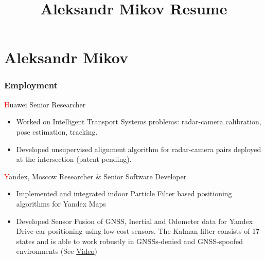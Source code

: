 \documentclass{tccv}
\title{Aleksandr Mikov Resume}
\makeatletter
\newcommand{\about@me}{}
\newcommand{\aboutme}[1]{\renewcommand{\about@me}{\subsection{About Me}#1}}
\makeatother
\begin{document}
\aboutme{\center{PhD, Researcher and algorithm developer in the indoor and outdoor navigation field\\with an emphasis on automotive and pedestrian applications.}}
\part{Aleksandr Mikov}

\section{Employment}

\begin{eventlist}
     {\textcolor{red}{H}uawei}
     {Senior Researcher}
\begin{itemize}
     \item Worked on Intelligent Transport Systems problems: radar-camera calibration, pose estimation, tracking.
     \item Developed unsupervised alignment algorithm for radar-camera pairs deployed at the intersection (patent pending).
\end{itemize}

\begin{eventlist}

     {\textcolor{red}{Y}andex, Moscow}
     {Researcher \& Senior Software Developer}
\begin{itemize}
    \item Implemented and integrated indoor Particle Filter based positioning algorithms for Yandex Maps
    \item Developed Sensor Fusion of GNSS, Inertial and Odometer data for Yandex Drive car positioning using low-cost sensors. The Kalman filter consists of 17 states and is able to work robustly in GNSSs-denied and GNSS-spoofed environments (See \href{https://www.dropbox.com/s/jkawevakrhy58hc/LefortovskiyFast.mp4}{Video})
\end{itemize}


\end{eventlist}
\end{eventlist}
\end{document}
